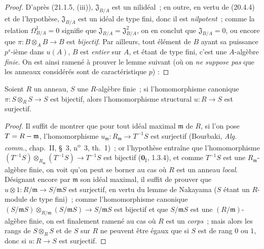 \begin{proof}
D'après (21.1.5, (iii)), $\mathfrak J_{B/A}$ est un nilidéal~; en outre,
en vertu de (20.4.4) et de l'hypothèse, $\mathfrak J_{B/A}$ est un idéal de
type fini, donc il est \emph{nilpotent}~; comme la relation $\Omega^1_{B/A}=0$
signifie que $\mathfrak J_{B/A}=\mathfrak J_{B/A}^2$, on en conclut que
$\mathfrak J_{B/A}=0$, ou encore que $\pi:B\otimes_A B\to B$ est \emph{bijectif}.
Par ailleurs, tout élément de $B$ ayant sa puissance $p^s$-ième dans $u(A)$,
$B$ est \emph{entier} sur $A$, et étant de type fini, c'est une $A$-algèbre \emph{finie}.
On est ainsi ramené à prouver le lemme suivant (où on \emph{ne suppose pas} que
les anneaux considérés sont de caractéristique $p$) :
\end{proof}

\begin{lemma}[21.1.6.1]
\label{0.21.1.6.1-fr}
Soient $R$ un anneau, $S$ une $R$-algèbre finie~; si l'homomorphisme
canonique $\pi:S\otimes_R S\to S$ est bijectif, alors l'homomorphisme
structural $u:R\to S$ est surjectif.
\end{lemma}

\begin{proof}
Il suffit de montrer que pour tout idéal maximal $\mathfrak m$ de $R$, si
l'on pose $T=R-\mathfrak m$, l'homomorphisme
$u_{\mathfrak m}:R_{\mathfrak m}\to T^{-1}S$ est surjectif (Bourbaki,
\emph{Alg. comm.}, chap.~II, §~3, n\textsuperscript{o}~3, th.~1)~; or l'hypothèse
entraîne que l'homomorphisme
$(T^{-1}S)\otimes_{R_{\mathfrak m}}(T^{-1}S)\to T^{-1}S$
est bijectif ($\mathbf{0}_{\mathrm I}$, 1.3.4), et comme $T^{-1}S$ est une
$R_{\mathfrak m}$-algèbre finie, on voit qu'on peut se borner au cas où
$R$ est un anneau \emph{local}.
Désignant encore par $\mathfrak m$ son idéal maximal, il suffit de prouver que
$u\otimes1:R/\mathfrak m\to S/\mathfrak mS$ est surjectif, en vertu du
lemme de Nakayama ($S$ étant un $R$-module de type fini)~; comme
l'homomorphisme canonique
$(S/\mathfrak mS)\otimes_{R/\mathfrak m}(S/\mathfrak mS)\to S/\mathfrak mS$
est bijectif et que $S/\mathfrak mS$ est une $(R/\mathfrak m)$-algèbre finie,
on est finalement ramené au cas où $R$ est un \emph{corps}~; mais alors les rangs de
$S\otimes_R S$ et de $S$ sur $R$ ne peuvent être égaux que si $S$ est de rang
$0$ ou $1$, donc si $u:R\to S$ est surjectif.
\end{proof}

